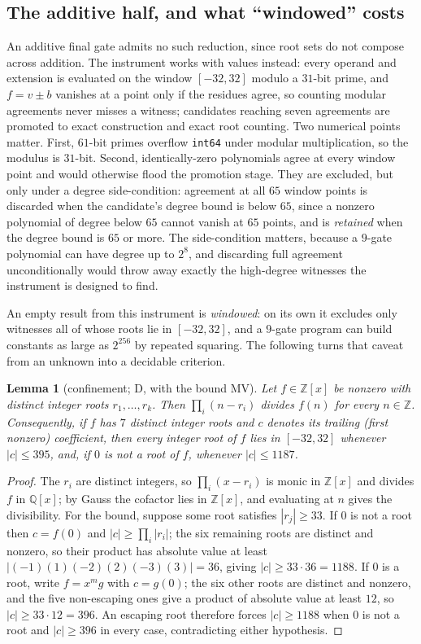 \documentclass[11pt]{article}
\newtheorem{lemma}[theorem]{Lemma}
\theoremstyle{definition}
\theoremstyle{remark}
\newcommand{\Z}{\mathbb{Z}}
\begin{document}
\subsection{The additive half, and what ``windowed'' costs}\label{sec:seven:add}

An additive final gate admits no such reduction, since root sets do not compose
across addition. The instrument works with values instead: every operand and
extension is evaluated on the window $[-32,32]$ modulo a $31$-bit prime, and
$f = v \pm b$ vanishes at a point only if the residues agree, so counting
modular agreements never misses a witness; candidates reaching seven agreements
are promoted to exact construction and exact root counting. Two numerical
points matter. First, $61$-bit primes overflow \texttt{int64} under
modular multiplication, so the modulus is $31$-bit. Second, identically-zero
polynomials agree at every window point and would otherwise flood the
promotion stage. They are excluded, but only under a degree side-condition:
agreement at all $65$ window points is discarded when the candidate's degree
bound is below $65$, since a nonzero polynomial of degree below $65$ cannot
vanish at $65$ points, and is \emph{retained} when the degree bound is $65$ or
more. The side-condition matters, because a $9$-gate polynomial can have degree
up to $2^8$, and discarding full agreement unconditionally would throw
away exactly the high-degree witnesses the instrument is designed to find.

An empty result from this instrument is \emph{windowed}: on its own it excludes
only witnesses all of whose roots lie in $[-32,32]$, and a $9$-gate program
can build constants as large as $2^{256}$ by repeated squaring. The following turns
that caveat from an unknown into a decidable criterion.

\begin{lemma}[confinement; D, with the bound MV]\label{lem:confine}
Let $f \in \Z[x]$ be nonzero with distinct integer roots $r_1,\dots,r_k$. Then
$\prod_i (n - r_i)$ divides $f(n)$ for every $n \in \Z$. Consequently, if $f$
has $7$ distinct integer roots and $c$ denotes its trailing (first nonzero)
coefficient, then every integer root of $f$ lies in $[-32,32]$ whenever
$|c| \le 395$, and, if $0$ is not a root of $f$, whenever $|c| \le 1187$.
\end{lemma}
\begin{proof}
The $r_i$ are distinct integers, so $\prod_i (x - r_i)$ is monic in $\Z[x]$ and
divides $f$ in $\mathbb{Q}[x]$; by Gauss the cofactor lies in $\Z[x]$, and evaluating at
$n$ gives the divisibility. For the bound, suppose some root satisfies
$|r_j| \ge 33$. If $0$ is not a root then $c = f(0)$ and $|c| \ge \prod_i|r_i|$;
the six remaining roots are distinct and nonzero, so their product has absolute
value at least $|(-1)(1)(-2)(2)(-3)(3)| = 36$, giving $|c| \ge 33 \cdot 36 =
1188$. If $0$ is a root, write $f = x^m g$ with $c = g(0)$; the six other roots
are distinct and nonzero, and the five non-escaping ones give a product of
absolute value at least $12$, so $|c| \ge 33 \cdot 12 = 396$. An escaping root
therefore forces $|c| \ge 1188$ when $0$ is not a root and $|c| \ge 396$ in every
case, contradicting either hypothesis.
\end{proof}
\end{document}
